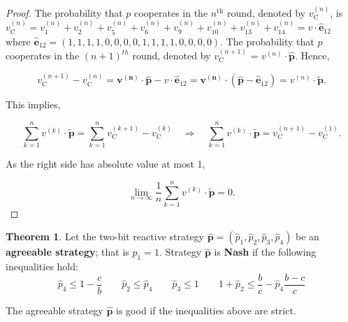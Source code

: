 \documentclass{article}
\theoremstyle{definition}
\newtheorem{theorem}{Theorem}[section]
\begin{document}
\begin{proof}
The probability that \(p\) cooperates in the \(n^{\text{th}}\) round, denoted
by \(v_{\text{C}}^{(n)}\), is \(v_{\text{C}}^{(n)} = v_{1}^{(n)} +
v_{2}^{(n)} + v_{5}^{(n)} + v_{6}^{(n)} + v_{9}^{(n)} +  v_{10}^{(n)} +
v_{13}^{(n)} + v_{14}^{(n)} = v \cdot \mathbf{\hat{e}}_{1 2}\)
where \(\mathbf{\hat{e}}_{1 2} = (1, 1, 1, 1, \allowbreak 0,
0, 0, 0, 1, 1, 1, 1, 0, 0, 0, 0)\). The probability that \(p\) cooperates in the \((n + 1)^{th}\) round, denoted
by \(v_{\text{C}}^{(n + 1)}\) = \(v^{(n)} \cdot \mathbf{\hat{p}}\).
Hence,

\begin{equation*}
v_{\text{C}}^{(n + 1)} - v_{\text{C}}^{(n)} = \mathbf{v^{(n)}} \cdot \mathbf{\hat{p}} - v \cdot \mathbf{\hat{e}}_{1 2}
= \mathbf{v^{(n)}} \cdot (\mathbf{\hat{p}} - \mathbf{\hat{e}}_{1 2}) = v^{(n)} \cdot \mathbf{\tilde{p}}.
\end{equation*}

This implies,

\begin{equation}
\sum^{n}_{k=1} v^{(k)} \cdot \mathbf{\tilde{p}} = \sum^{n}_{k=1} v_{\text{C}}^{(k + 1)} - v_{\text{C}}^{(k)} \quad \Rightarrow \quad \sum^{n}_{k=1} v^{(k)} \cdot \mathbf{\tilde{p}} =  v_{\text{C}}^{(n + 1)} - v_{\text{C}}^{(1)}.
\end{equation}

As the right side has absolute value at most 1,

\begin{equation}
\lim_{n \rightarrow \infty} \frac{1}{n} \sum^{n}_{k=1} v^{(k)} \cdot \mathbf{\tilde{p}} = 0. 
\end{equation}

\end{proof}

\begin{theorem}\label{theorem:two_bit_nash_and_good}
    Let the two-bit reactive strategy \(\mathbf{\hat{p}} = (\hat{p}_{1}, \hat{p}_{2}, \hat{p}_{3}, \hat{p}_{4})\) be an \textbf{agreeable
    strategy}; that is \(\hat{p}_1 = 1\). Strategy \(\mathbf{\hat{p}}\) is \textbf{Nash} if the
    following inequalities hold:
    \begin{equation*}
        \hat{p}_4 \leq 1 - \frac{c}{b} \qquad  \hat{p}_2  \leq \hat{p}_4 \qquad \hat{p}_3 \leq 1 \qquad 1 + \hat{p}_2 \leq \frac{b}{c} - \hat{p}_4 \frac{b\!-\!c}{c}
    \end{equation*}
    
    The agreeable strategy \(\mathbf{\hat{p}}\) is good if the inequalities above are strict.
    \end{theorem}
    
\end{document}
